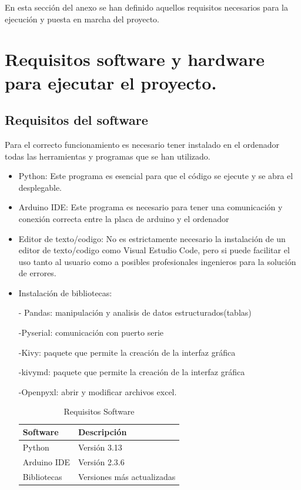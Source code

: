 En esta sección del anexo se han definido aquellos requisitos necesarios para la ejecución y puesta en marcha del proyecto. 
\section{Requisitos software y hardware para ejecutar el proyecto.}
\subsection{Requisitos del software}
Para el correcto funcionamiento es necesario tener instalado en el ordenador todas las herramientas y programas que se han utilizado. 
\begin{itemize}
    \item Python: Este programa es esencial para que el código se ejecute y se abra el desplegable.
    \item Arduino IDE: Este programa es necesario para tener una comunicación y conexión correcta entre la placa de arduino y el ordenador 
    \item Editor de texto/codigo: No es estrictamente necesario la instalación de un editor de texto/codigo como Visual Estudio Code, pero si puede facilitar el uso tanto al usuario como a posibles profesionales ingenieros para la solución de errores.
    \item Instalación de bibliotecas:
    
    - Pandas: manipulación y analisis de datos estructurados(tablas)
    
    -Pyserial: comunicación con puerto serie
    
    -Kivy: paquete que permite la creación de la interfaz gráfica
    
    -kivymd: paquete que permite la creación de la interfaz gráfica

    -Openpyxl: abrir y modificar archivos excel.
    
    

\begin{table}[]
\centering
\begin{tabular}{|l|l|}
\hline
\rowcolor[HTML]{BFBFBF} 
\textbf{Software} & \textbf{Descripción} \\ \hline
Python & Versión 3.13\\ \hline
Arduino IDE & Versión 2.3.6\\ \hline
Bibliotecas & Versiones más actualizadas\\ \hline
\end{tabular}
\caption{Requisitos Software}
\label{tab:Requisitos_Software}
\end{table}
\end{itemize}
